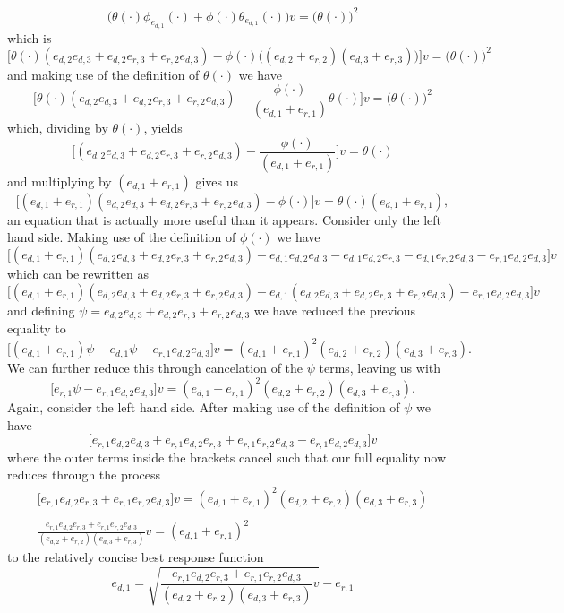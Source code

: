 \documentclass[a4paper,12pt]{article}
\begin{document}
$$
\Big( \theta(\cdot)\phi_{e_{d,1}}(\cdot) + \phi(\cdot)\theta_{e_{d,1}}(\cdot) \Big) v = \Big ( \theta(\cdot) \Big )^2 
$$ 
which is 
$$
\Big [ \theta(\cdot)(e_{d,2}e_{d,3} + e_{d,2}e_{r,3} + e_{r,2}e_{d,3}) - \phi(\cdot) \Big ((e_{d,2}+e_{r,2})(e_{d,3}+e_{r,3}) \Big) \Big ] v = \Big ( \theta(\cdot) \Big )^2 
$$
and making use of the definition of $\theta(\cdot)$ we have
$$
\Big [ \theta(\cdot)(e_{d,2}e_{d,3} + e_{d,2}e_{r,3} + e_{r,2}e_{d,3}) - \frac{\phi(\cdot)}{(e_{d,1}+e_{r,1})} \theta(\cdot) \Big ] v = \Big ( \theta(\cdot) \Big )^2
$$
which, dividing by $\theta(\cdot)$, yields
$$
\Big [(e_{d,2}e_{d,3} + e_{d,2}e_{r,3} + e_{r,2}e_{d,3}) - \frac{\phi(\cdot)}{(e_{d,1}+e_{r,1})} \Big ] v = \theta(\cdot)
$$
and multiplying by $(e_{d,1}+e_{r,1})$ gives us
$$
\Big [(e_{d,1}+e_{r,1})(e_{d,2}e_{d,3} + e_{d,2}e_{r,3} + e_{r,2}e_{d,3}) - \phi(\cdot) \Big ] v = \theta(\cdot)(e_{d,1}+e_{r,1}),
$$
an equation that is actually more useful than it appears. Consider only the left hand side. Making use of the definition of $\phi(\cdot)$ we have
$$
\Big [(e_{d,1}+e_{r,1})(e_{d,2}e_{d,3} + e_{d,2}e_{r,3} + e_{r,2}e_{d,3}) - e_{d,1}e_{d,2}e_{d,3} - e_{d,1}e_{d,2}e_{r,3} - e_{d,1}e_{r,2}e_{d,3} - e_{r,1}e_{d,2}e_{d,3}  \Big ] v
$$
which can be rewritten as
$$
\Big [(e_{d,1}+e_{r,1})(e_{d,2}e_{d,3} + e_{d,2}e_{r,3} + e_{r,2}e_{d,3}) - e_{d,1}(e_{d,2}e_{d,3} + e_{d,2}e_{r,3} + e_{r,2}e_{d,3}) - e_{r,1}e_{d,2}e_{d,3}  \Big ] v
$$
and defining $ \psi = e_{d,2}e_{d,3} + e_{d,2}e_{r,3} + e_{r,2}e_{d,3} $ we have reduced the previous equality to
$$
\Big [(e_{d,1}+e_{r,1}) \psi - e_{d,1} \psi - e_{r,1}e_{d,2}e_{d,3}  \Big ] v = (e_{d,1}+e_{r,1})^2 (e_{d,2}+e_{r,2})(e_{d,3}+e_{r,3}) .
$$
We can further reduce this through cancelation of the $ \psi $ terms, leaving us with
$$
\Big [e_{r,1} \psi - e_{r,1}e_{d,2}e_{d,3}  \Big ] v = (e_{d,1}+e_{r,1})^2 (e_{d,2}+e_{r,2})(e_{d,3}+e_{r,3}) .
$$
Again, consider the left hand side. After making use of the definition of $\psi$ we have
$$
\Big [e_{r,1}e_{d,2}e_{d,3}  +  e_{r,1}e_{d,2}e_{r,3} + e_{r,1}e_{r,2}e_{d,3}  - e_{r,1}e_{d,2}e_{d,3}  \Big ] v 
$$
where the outer terms inside the brackets cancel such that our full equality now reduces through the process
\begin{gather*}
\Big [e_{r,1}e_{d,2}e_{r,3} + e_{r,1}e_{r,2}e_{d,3}  \Big ] v = (e_{d,1}+e_{r,1})^2 (e_{d,2}+e_{r,2})(e_{d,3}+e_{r,3}) \\ \\
\frac{e_{r,1}e_{d,2}e_{r,3} + e_{r,1}e_{r,2}e_{d,3}}{(e_{d,2}+e_{r,2})(e_{d,3}+e_{r,3})} v = (e_{d,1}+e_{r,1})^2
\end{gather*}
to the relatively concise best response function
\begin{equation}
e_{d,1} = \sqrt{\frac{e_{r,1}e_{d,2}e_{r,3} + e_{r,1}e_{r,2}e_{d,3}}{(e_{d,2}+e_{r,2})(e_{d,3}+e_{r,3})} v} - e_{r,1} 
\end{equation}
\\
\end{document}
